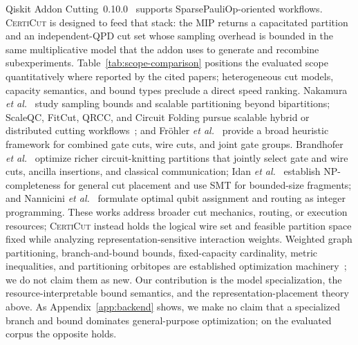 \documentclass[
  aps,
  pra,
  reprint,
  amsmath,
  amssymb,
  longbibliography,
  nofootinbib,
  floatfix
]{revtex4-2}
\theoremstyle{plain}
\newcommand{\CertiCut}{\textsc{CertiCut}}
\begin{document}
Qiskit Addon Cutting~0.10.0~\cite{qiskitcutting} supports SparsePauliOp-oriented workflows. \CertiCut{} is designed to feed that stack: the MIP returns a capacitated partition and an independent-QPD cut set whose sampling overhead is bounded in the same multiplicative model that the addon uses to generate and recombine subexperiments. Table~\ref{tab:scope-comparison} positions the evaluated scope quantitatively where reported by the cited papers; heterogeneous cut models, capacity semantics, and bound types preclude a direct speed ranking. Nakamura \emph{et al.}~\cite{nakamura2025} study sampling bounds and scalable partitioning beyond bipartitions; ScaleQC, FitCut, QRCC, and Circuit Folding pursue scalable hybrid or distributed cutting workflows~\cite{scaleqc2022,fitcut2024,qrcc2025,circuitfolding2025}; and Fr{\"o}hler \emph{et al.}~\cite{frohler2026} provide a broad heuristic framework for combined gate cuts, wire cuts, and joint gate groups. Brandhofer \emph{et al.}~\cite{brandhofer2024} optimize richer circuit-knitting partitions that jointly select gate and wire cuts, ancilla insertions, and classical communication; Idan \emph{et al.}~\cite{idan2026} establish NP-completeness for general cut placement and use SMT for bounded-size fragments; and Nannicini \emph{et al.}~\cite{nannicini2022} formulate optimal qubit assignment and routing as integer programming. These works address broader cut mechanics, routing, or execution resources; \CertiCut{} instead holds the logical wire set and feasible partition space fixed while analyzing representation-sensitive interaction weights. Weighted graph partitioning, branch-and-bound bounds, fixed-capacity cardinality, metric inequalities, and partitioning orbitopes are established optimization machinery~\cite{deza1997,lawler1966,kaibel2008}; we do not claim them as new. Our contribution is the model specialization, the resource-interpretable bound semantics, and the representation-placement theory above. As Appendix~\ref{app:backend} shows, we make no claim that a specialized branch and bound dominates general-purpose optimization; on the evaluated corpus the opposite holds.
\end{document}
